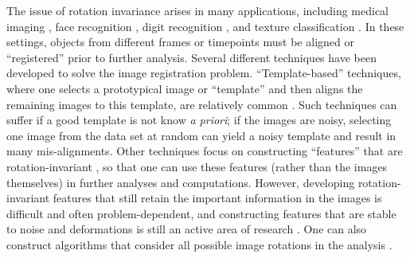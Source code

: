 \documentclass[10pt]{article}
\begin{document}
The issue of rotation invariance arises in many applications, including medical imaging \cite{hajnal2010medical}, face recognition \cite{rowley1998rotation}, digit recognition \cite{simard1992efficient}, and texture classification \cite{greenspan1994rotation}.
%
In these settings, objects from different frames or timepoints must be aligned or ``registered'' prior to further analysis.
%
%
%
Several different techniques have been developed to solve the image registration problem. 
%
``Template-based'' techniques, where one selects a prototypical image or ``template'' and then aligns the remaining images to this template, are relatively common \cite{ahuja2007template}.
%
Such techniques can suffer if a good template is not know {\em a priori}; if the images are noisy, selecting one image from the data set at random can yield a noisy template and result in many mis-alignments. 
%
Other techniques focus on constructing ``features'' that are rotation-invariant \cite{flusser2000independence, lowe1999object, sadler1992shift, ojala2002multiresolution}, so that one can use these features (rather than the images themselves) in further analyses and computations.
%
However, developing rotation-invariant features that still retain the important information in the images is difficult and often problem-dependent, and constructing features that are stable to noise and deformations is still an active area of research \cite{mallat2012group, sifre2013rotation}.
%
One can also construct algorithms that consider all possible image rotations in the analysis \cite{hilai1994recognition, zhao2013fourier}.
%
\end{document}
